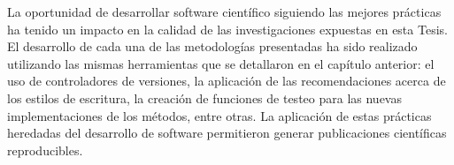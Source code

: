 La oportunidad de desarrollar software científico siguiendo las mejores
prácticas ha tenido un impacto en la calidad de las investigaciones
expuestas en esta Tesis.
El desarrollo de cada una de las metodologías presentadas ha sido realizado
utilizando las mismas herramientas que se detallaron en el capítulo anterior:
el uso de controladores de versiones, la aplicación de las recomendaciones
acerca de los estilos de escritura, la creación de funciones de testeo para las
nuevas implementaciones de los métodos, entre otras.
La aplicación de estas prácticas heredadas del desarrollo de software
permitieron generar publicaciones científicas reproducibles.






